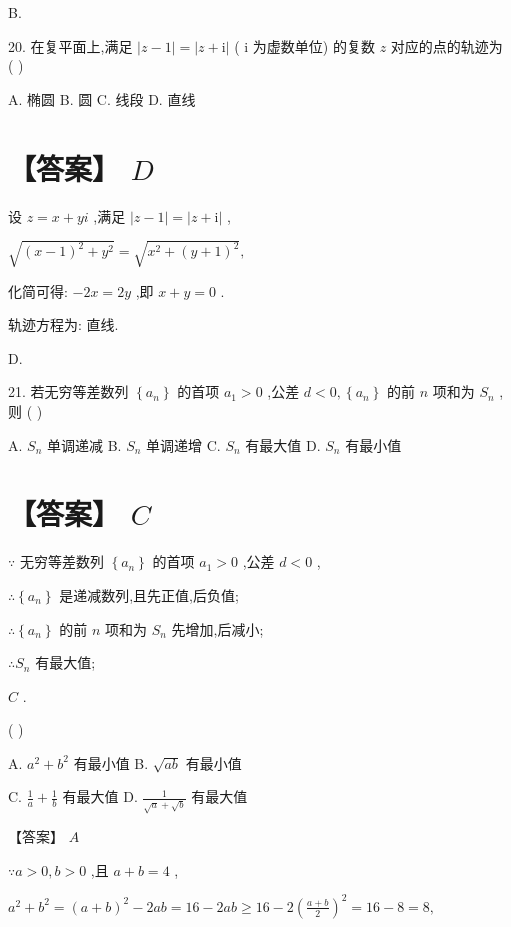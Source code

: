 \documentclass[10pt]{article}
\begin{document}
B.

20. 在复平面上,满足 \(\left| {z - 1}\right|  = \left| {z + \mathrm{i}}\right|\) ( \(\mathrm{i}\) 为虚数单位) 的复数 \(z\) 对应的点的轨迹为 ( )

A. 椭圆 B. 圆 C. 线段 D. 直线

\section*{【答案】 \(D\)}

设 \(z = x + {yi}\) ,满足 \(\left| {z - 1}\right|  = \left| {z + \mathrm{i}}\right|\) ,

\(\sqrt{{\left( x - 1\right) }^{2} + {y}^{2}} = \sqrt{{x}^{2} + {\left( y + 1\right) }^{2}},\)

化简可得: \(- {2x} = {2y}\) ,即 \(x + y = 0\) .

轨迹方程为: 直线.

D.

21. 若无穷等差数列 \(\left\{  {a}_{n}\right\}\) 的首项 \({a}_{1} > 0\) ,公差 \(d < 0,\left\{  {a}_{n}\right\}\) 的前 \(n\) 项和为 \({S}_{n}\) ,则 ( )

A. \({S}_{n}\) 单调递减 B. \({S}_{n}\) 单调递增 C. \({S}_{n}\) 有最大值 D. \({S}_{n}\) 有最小值

\section*{【答案】 \(C\)}

\(\because\) 无穷等差数列 \(\left\{  {a}_{n}\right\}\) 的首项 \({a}_{1} > 0\) ,公差 \(d < 0\) ,

\(\therefore \left\{  {a}_{n}\right\}\) 是递减数列,且先正值,后负值;

\(\therefore \left\{  {a}_{n}\right\}\) 的前 \(n\) 项和为 \({S}_{n}\) 先增加,后减小;

\(\therefore {S}_{n}\) 有最大值;

\(C\) .

( )

A. \({a}^{2} + {b}^{2}\) 有最小值 B. \(\sqrt{ab}\) 有最小值

C. \(\frac{1}{a} + \frac{1}{b}\) 有最大值 D. \(\frac{1}{\sqrt{a} + \sqrt{b}}\) 有最大值

【答案】 \(A\)

\(\because a > 0,b > 0\) ,且 \(a + b = 4\) ,

\({a}^{2} + {b}^{2} = {\left( a + b\right) }^{2} - {2ab} = {16} - {2ab} \geq  {16} - 2{\left( \frac{a + b}{2}\right) }^{2} = {16} - 8 = 8,\)
\end{document}
